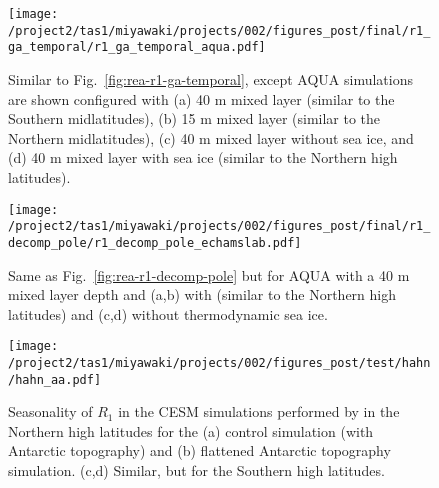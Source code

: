 \documentclass{ametsocV5}
\begin{document}
\begin{figure}
  \noindent\texttt{[image: /project2/tas1/miyawaki/projects/002/figures\_post/final/r1\_ga\_temporal/r1\_ga\_temporal\_aqua.pdf]}\\
    \caption{Similar to Fig.~\ref{fig:rea-r1-ga-temporal}, except AQUA simulations are shown configured with (a) 40 m mixed layer (similar to the Southern midlatitudes), (b) 15 m mixed layer (similar to the Northern midlatitudes), (c) 40 m mixed layer without sea ice, and (d) 40 m mixed layer with sea ice (similar to the Northern high latitudes).}
    \label{fig:echam-r1-ga-temporal}
\end{figure}

\begin{figure}[t]
    \noindent\texttt{[image: /project2/tas1/miyawaki/projects/002/figures\_post/final/r1\_decomp\_pole/r1\_decomp\_pole\_echamslab.pdf]}\\
    \caption{Same as Fig.~\ref{fig:rea-r1-decomp-pole} but for AQUA with a 40 m mixed layer depth and (a,b) with (similar to the Northern high latitudes) and (c,d) without thermodynamic sea ice.}
    \label{fig:echam-rae}
\end{figure}

\begin{figure}[t]
    \noindent\texttt{[image: /project2/tas1/miyawaki/projects/002/figures\_post/test/hahn/hahn\_aa.pdf]}\\
    \caption{Seasonality of $R_1$ in the CESM simulations performed by \cite{hahn2020} in the Northern high latitudes for the (a) control simulation (with Antarctic topography) and (b) flattened Antarctic topography simulation. (c,d) Similar, but for the Southern high latitudes.}
    \label{fig:hahn-aa}
\end{figure}

\end{document}
